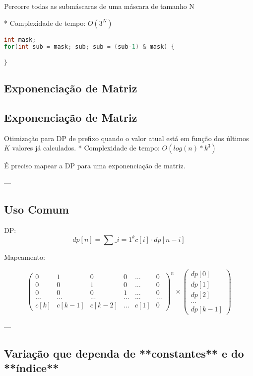 \documentclass[11pt, a4paper, twoside]{article}
\begin{document}
Percorre todas as submáscaras de uma máscara de tamanho N

* Complexidade de tempo: $O(3^N)$

\begin{multicols}{2}
\begin{lstlisting}[language=C++]
int mask;
for(int sub = mask; sub; sub = (sub-1) & mask) {

}
\end{lstlisting}
\end{multicols}

\subsection{Exponenciação de Matriz}

\subsection{Exponenciação de Matriz}



Otimização para DP de prefixo quando o valor atual está em função dos últimos $K$ valores já calculados.   
* Complexidade de tempo: $O(log(n)*k^3)$

É preciso mapear a DP para uma exponenciação de matriz.

---


\subsection{Uso Comum}


DP:   
$$ dp[n] = \sum\_{i=1}^{k} c[i] \cdot dp[n - i]$$ 

Mapeamento:   

$$ \begin{pmatrix} 0&1&0&0&...&0 \\ 0&0&1&0&...&0 \\ 0&0&0&1&...&0 \\ ...&...&...&...&...&... \\ c[k]&c[k-1]&c[k-2]&...&c[1]&0 \end{pmatrix}^n \times \begin{pmatrix} dp[0] \\ dp[1] \\ dp[2] \\ ... \\ dp[k-1] \end{pmatrix} $$

---
\subsection{Variação que dependa de **constantes** e do **índice**}
\end{document}
